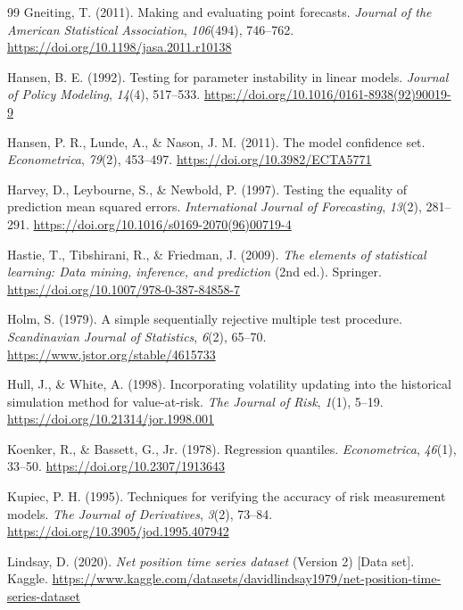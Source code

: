 \documentclass[11pt,a4paper]{article}
\begin{document}
\begin{thebibliography}{99}
 Gneiting, T. (2011). Making and evaluating point forecasts. \emph{Journal of the American Statistical Association}, \emph{106}(494), 746--762. \url{https://doi.org/10.1198/jasa.2011.r10138}

 Hansen, B. E. (1992). Testing for parameter instability in linear models. \emph{Journal of Policy Modeling}, \emph{14}(4), 517--533. \url{https://doi.org/10.1016/0161-8938(92)90019-9}

 Hansen, P. R., Lunde, A., \& Nason, J. M. (2011). The model confidence set. \emph{Econometrica}, \emph{79}(2), 453--497. \url{https://doi.org/10.3982/ECTA5771}


\raggedright

 Harvey, D., Leybourne, S., \& Newbold, P. (1997). Testing the equality of prediction mean squared errors. \emph{International Journal of Forecasting}, \emph{13}(2), 281--291. \url{https://doi.org/10.1016/s0169-2070(96)00719-4}

 Hastie, T., Tibshirani, R., \& Friedman, J. (2009). \emph{The elements of statistical learning: Data mining, inference, and prediction} (2nd ed.). Springer. \url{https://doi.org/10.1007/978-0-387-84858-7}

 Holm, S. (1979). A simple sequentially rejective multiple test procedure. \emph{Scandinavian Journal of Statistics}, \emph{6}(2), 65--70. \url{https://www.jstor.org/stable/4615733}

 Hull, J., \& White, A. (1998). Incorporating volatility updating into the historical simulation method for value-at-risk. \emph{The Journal of Risk}, \emph{1}(1), 5--19. \url{https://doi.org/10.21314/jor.1998.001}

 Koenker, R., \& Bassett, G., Jr. (1978). Regression quantiles. \emph{Econometrica}, \emph{46}(1), 33--50. \url{https://doi.org/10.2307/1913643}

 Kupiec, P. H. (1995). Techniques for verifying the accuracy of risk measurement models. \emph{The Journal of Derivatives}, \emph{3}(2), 73--84. \url{https://doi.org/10.3905/jod.1995.407942}

 Lindsay, D. (2020). \emph{Net position time series dataset} (Version 2) [Data set]. Kaggle. \url{https://www.kaggle.com/datasets/davidlindsay1979/net-position-time-series-dataset}


\end{thebibliography}
\end{document}
